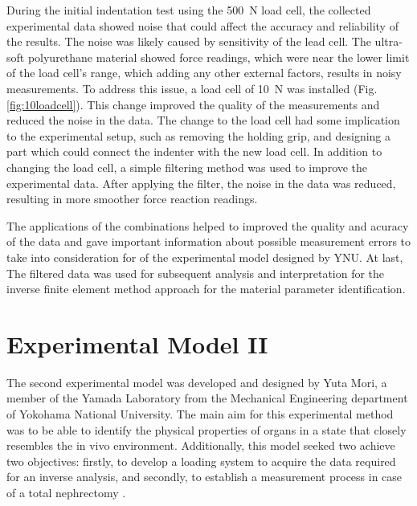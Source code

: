 During the initial indentation test using the \SI{500}{\newton} load cell, 
the collected experimental data showed noise that could affect the accuracy 
and reliability of the results. The noise was likely caused by sensitivity 
of the lead cell. The ultra-soft polyurethane material showed force readings, which 
were near the lower limit of the load cell's range, which adding any other external factors, 
results in noisy measurements. To address this issue, a load cell of \SI{10}{\newton}
was installed (Fig. \ref{fig:10loadcell}). This change improved the quality of 
the measurements and reduced the noise in the data. The change to the load cell had some 
implication to the experimental setup, such as removing the holding grip, and designing 
a part which could connect the indenter with the new load cell. In addition to changing 
the load cell, a simple filtering method was used to improve the experimental data. After 
applying the filter, the noise in the data was reduced, resulting in more smoother 
force reaction readings. 

The applications of the combinations helped to improved the quality and acuracy 
of the data and gave important information about possible measurement errors to 
take into consideration for of the experimental model 
designed by YNU. At last, The filtered data was used for subsequent analysis and 
interpretation for the inverse finite element method approach for the material parameter 
identification.


\section{Experimental Model II}
\label{section:expmod2}

The second experimental model was developed and designed by Yuta Mori, a 
member of the Yamada Laboratory from the Mechanical Engineering department of 
 Yokohama National University. 
The main aim for this experimental method was to be able to identify the physical 
properties of organs in a state that closely resembles the in vivo environment.
Additionally, this model seeked two achieve two objectives: firstly, to develop a 
loading system to acquire the data required for an inverse analysis, and secondly, 
to establish a measurement process in case of a total nephrectomy \cite{Mori2022}. 

